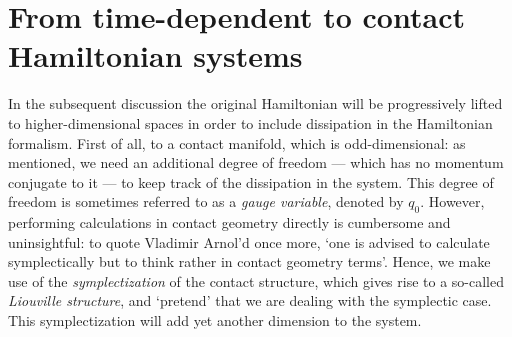 %
%

\section{From time-dependent to contact Hamiltonian systems}
In the subsequent discussion the original Hamiltonian will be progressively lifted to higher-dimensional spaces in order to include dissipation in the Hamiltonian formalism. First of all, to a contact manifold, which is odd-dimensional: as mentioned, we need an additional degree of freedom --- which has no momentum conjugate to it --- to keep track of the dissipation in the system. This degree of freedom is sometimes referred to as a \emph{gauge variable}, denoted by $q_0$.  However, performing calculations in contact geometry directly is cumbersome and uninsightful: to quote Vladimir Arnol'd once more, `one is advised to calculate symplectically but to think rather in contact geometry terms'. Hence, we make use of the \emph{symplectization} of the contact structure, which gives rise to a so-called \emph{Liouville structure}, and `pretend' that we are dealing with the symplectic case. This symplectization will add yet another dimension to the system. \cite{VanderSchaft2021a,Arnold1989a}

